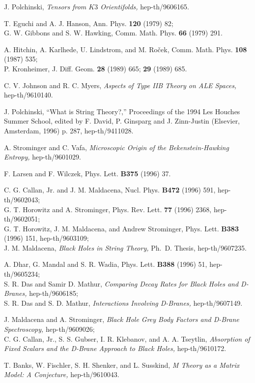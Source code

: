 \begin{thebibliography}{99}
J. Polchinski, {\it Tensors from $K3$ Orientifolds,} hep-th/9606165.

T. Eguchi and A. J. Hanson, Ann. Phys. {\bf 120} (1979) 82;\\
G. W. Gibbons and S. W. Hawking, Comm. Math. Phys. {\bf 66} (1979) 291.

A. Hitchin, A. Karlhede, U. Lindstrom, and M. Ro\v cek,
Comm. Math. Phys. {\bf 108} (1987) 535;\\
P. Kronheimer, J. Diff. Geom. {\bf 28} (1989) 665; {\bf 29} (1989) 685.

C. V. Johnson and R. C. Myers, {\it Aspects of Type IIB Theory on ALE Spaces,}
hep-th/9610140.

J. Polchinski, ``What is String Theory?,'' 
Proceedings of the 1994 Les Houches Summer
School, edited by F. David, P. Ginsparg and J. Zinn-Justin
(Elsevier, Amsterdam, 1996) p. 287,
hep-th/9411028.

A. Strominger and C. Vafa, {\it Microscopic Origin of
the Bekenstein-Hawking Entropy,} hep-th/9601029.

F. Larsen and F. Wilczek, Phys. Lett. {\bf B375} (1996) 37.

C. G. Callan, Jr. and J. M. Maldacena, Nucl. Phys. {\bf B472}
(1996) 591, hep-th/9602043;\\
G. T. Horowitz and A. Strominger, Phys. Rev. Lett. {\bf 77}
(1996) 2368, hep-th/9602051;\\
G. T. Horowitz, J. M. Maldacena, and
Andrew Strominger, Phys. Lett. {\bf B383} (1996) 151, hep-th/9603109;\\
J. M. Maldacena, {\it Black Holes in String Theory,} Ph.~D. Thesis,
hep-th/9607235.

A. Dhar, G. Mandal and S. R. Wadia, Phys. Lett. {\bf B388} (1996) 51,
hep-th/9605234;\\
S. R. Das and Samir D. Mathur, {\it Comparing Decay Rates for Black Holes and
D-Branes,} hep-th/9606185;\\
S. R. Das and S. D. Mathur, {\it Interactions Involving D-Branes,}
hep-th/9607149. 

J. Maldacena and A. Strominger, {\it Black Hole Grey Body Factors and D-Brane
Spectroscopy,} hep-th/9609026;\\
C. G. Callan, Jr., S. S. Gubser, I. R. Klebanov, and A. A. Tseytlin,
{\it Absorption of Fixed Scalars and the D-Brane Approach to Black Holes,}
hep-th/9610172.

T. Banks, W. Fischler, S. H. Shenker, and L. Susskind, {\it M Theory as a Matrix
Model: A Conjecture,} hep-th/9610043.

\end{thebibliography}





